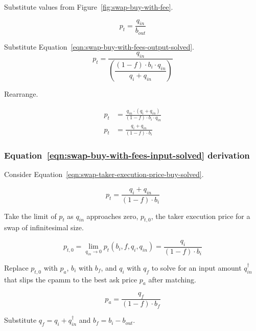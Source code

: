 \documentclass[table, twocolumn]{article}
\begin{document}
Substitute values from Figure~\ref{fig:swap-buy-with-fee}.

\begin{equation}
  p_t = \frac{q_{in}}{b_{out}}
\end{equation}

Substitute Equation~\ref{eqn:swap-buy-with-fees-output-solved}.
\begin{equation}
  p_t = \frac{q_{in}}{\left(\dfrac{(1 - f) \cdot b_i \cdot q_{in}}{q_i + q_{in}}\right)}
\end{equation}

Rearrange.

\begin{align}
  p_t & =
  \frac{q_{in} \cdot (q_i + q_{in})}{(1 - f) \cdot b_i \cdot q_{in}} \nonumber \\
  p_t & = \frac{q_i + q_{in}}{(1 - f) \cdot b_i} \nonumber
\end{align}

\subsubsection{Equation~\ref{eqn:swap-buy-with-fees-input-solved} derivation}%
\label{sssec:equation-eqn:swap-buy-with-fees-input-solved-derivation}

Consider Equation~\ref{eqn:swap-taker-execution-price-buy-solved}.

\begin{equation}
  p_t = \frac{q_i + q_{in}}{(1 - f) \cdot b_i} \nonumber
\end{equation}

Take the limit of $p_t$ as $q_{in}$ approaches zero, $p_{t, 0}$, the taker execution
price for a swap of infinitesimal size.

\begin{equation}
  p_{t, 0} = \lim_{q_{in} \to 0} p_t (b_i, f, q_i, q_{in}) =
  \frac{q_i}{(1 - f) \cdot b_i} \nonumber
\end{equation}

Replace $p_{t, 0}$ with $p_a$, $b_i$ with $b_f$, and $q_i$ with $q_f$ to solve for an
input amount $q_{in}^{\dagger}$ that slips the \gls*{cpamm} to the best ask price $p_a$
after matching.

\begin{equation}
  p_a = \frac{q_f}{(1 - f) \cdot b_f} \nonumber
\end{equation}

Substitute $q_f = q_i + q_{in}^{\dagger}$ and $b_f = b_i - b_{out}$.
\end{document}
